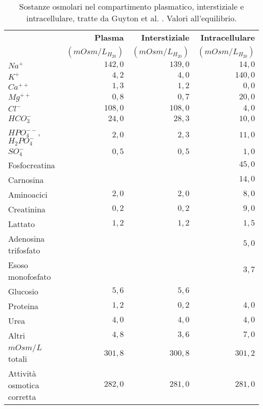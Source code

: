 \begin{table}[htb]
	\centering
	\caption{Sostanze osmolari nel compartimento plasmatico, interstiziale e intracellulare, tratte da Guyton et al. \cite{guyton}. Valori all'equilibrio.}
	\begin{tabular}{lrrr}
	\toprule 
		& \textbf{Plasma}        & \textbf{Interstiziale} & \textbf{Intracellulare}       \\
  	& $(mOsm/L_{H_20})$ & $(mOsm/L_{H_20})$ & $(mOsm/L_{H_20})$ \\
  \midrule
  	$Na^+$                     &  $142,0$  &  $139,0$  &  $14,0$  \\
  	$K^+$                      &  $4,2$    &  $4,0$    &  $140,0$ \\
  	$Ca^{++}$                  &  $1,3$    &  $1,2$    &  $0,0$   \\
  	$Mg^{++}$                     &  $0,8$    &  $0,7$    &  $20,0$  \\
  	$Cl^-$                     &  $108,0$  &  $108,0$  &  $4,0$   \\
  	$HCO_3^-$                  &  $24,0$   &  $28,3$   &  $10,0$  \\
  	$HPO_4^{--}$,$H_2PO_4^-$   &  $2,0$    &  $2,3$    &  $11,0$  \\
  	$SO_4^-$                   &  $0,5$    &  $0,5$    &  $1,0$   \\
  	Fosfocreatina              &           &           &  $45,0$  \\
  	Carnosina                  &           &           &  $14,0$  \\
  	Aminoacici                 &  $2,0$    &  $2,0$    &  $8,0$   \\
  	Creatinina                 &  $0,2$    &  $0,2$    &  $9,0$   \\
  	Lattato                    &  $1,2$    &  $1,2$    &  $1,5$   \\
  	Adenosina trifosfato       &           &           &  $5,0$   \\
  	Esoso monofosfato          &           &           &  $3,7$   \\
  	Glucosio                   &  $5,6$    &  $5,6$    &          \\
  	Proteina                   &  $1,2$    &  $0,2$    &  $4,0$   \\
  	Urea                       &  $4,0$    &  $4,0$    &  $4,0$   \\
  	Altri                      &  $4,8$    &  $3,6$    &  $7,0$  \\
  	$mOsm/L$ totali            &  $301,8$  &  $300,8$  &  $301,2$ \\
  \midrule
  	Attività osmotica corretta &  $282,0$  &  $281,0$  &  $281,0$   \\
  \bottomrule
\end{tabular}\label{tab:osmolarit}
\end{table}
